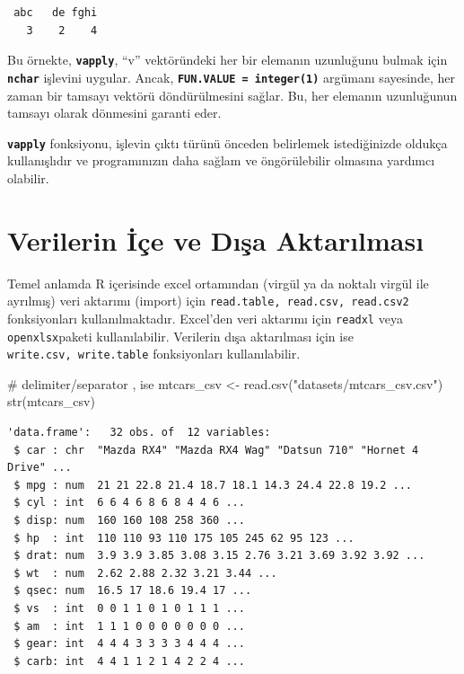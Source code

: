 \documentclass[
  letterpaper,
  DIV=11,
  numbers=noendperiod]{scrreprt}
\newenvironment{Shaded}{\begin{snugshade}}{\end{snugshade}}
\newcommand{\CommentTok}[1]{\textcolor[rgb]{0.37,0.37,0.37}{#1}}
\newcommand{\FunctionTok}[1]{\textcolor[rgb]{0.28,0.35,0.67}{#1}}
\newcommand{\NormalTok}[1]{\textcolor[rgb]{0.00,0.23,0.31}{#1}}
\newcommand{\OtherTok}[1]{\textcolor[rgb]{0.00,0.23,0.31}{#1}}
\newcommand{\StringTok}[1]{\textcolor[rgb]{0.13,0.47,0.30}{#1}}
\begin{document}
\begin{verbatim}
 abc   de fghi 
   3    2    4 
\end{verbatim}

Bu örnekte, \textbf{\texttt{vapply}}, ``v'' vektöründeki her bir
elemanın uzunluğunu bulmak için \textbf{\texttt{nchar}} işlevini
uygular. Ancak, \textbf{\texttt{FUN.VALUE\ =\ integer(1)}} argümanı
sayesinde, her zaman bir tamsayı vektörü döndürülmesini sağlar. Bu, her
elemanın uzunluğunun tamsayı olarak dönmesini garanti eder.

\textbf{\texttt{vapply}} fonksiyonu, işlevin çıktı türünü önceden
belirlemek istediğinizde oldukça kullanışlıdır ve programınızın daha
sağlam ve öngörülebilir olmasına yardımcı olabilir.

\chapter{Verilerin İçe ve Dışa
Aktarılması}\label{verilerin-iuxe7e-ve-dux131ux15fa-aktarux131lmasux131}

Temel anlamda R içerisinde excel ortamından (virgül ya da noktalı virgül
ile ayrılmış) veri aktarımı (import) için
\texttt{read.table,\ read.csv,\ read.csv2} fonksiyonları
kullanılmaktadır. Excel'den veri aktarımı için \texttt{readxl} veya
\texttt{openxlsx}paketi kullanılabilir. Verilerin dışa aktarılması için
ise \texttt{write.csv,\ write.table} fonksiyonları kullanılabilir.

\begin{Shaded}
\begin{Highlighting}[]
\CommentTok{\# delimiter/separator , ise}
\NormalTok{mtcars\_csv }\OtherTok{\textless{}{-}} \FunctionTok{read.csv}\NormalTok{(}\StringTok{"datasets/mtcars\_csv.csv"}\NormalTok{)}
\FunctionTok{str}\NormalTok{(mtcars\_csv)}
\end{Highlighting}
\end{Shaded}

\begin{verbatim}
'data.frame':   32 obs. of  12 variables:
 $ car : chr  "Mazda RX4" "Mazda RX4 Wag" "Datsun 710" "Hornet 4 Drive" ...
 $ mpg : num  21 21 22.8 21.4 18.7 18.1 14.3 24.4 22.8 19.2 ...
 $ cyl : int  6 6 4 6 8 6 8 4 4 6 ...
 $ disp: num  160 160 108 258 360 ...
 $ hp  : int  110 110 93 110 175 105 245 62 95 123 ...
 $ drat: num  3.9 3.9 3.85 3.08 3.15 2.76 3.21 3.69 3.92 3.92 ...
 $ wt  : num  2.62 2.88 2.32 3.21 3.44 ...
 $ qsec: num  16.5 17 18.6 19.4 17 ...
 $ vs  : int  0 0 1 1 0 1 0 1 1 1 ...
 $ am  : int  1 1 1 0 0 0 0 0 0 0 ...
 $ gear: int  4 4 4 3 3 3 3 4 4 4 ...
 $ carb: int  4 4 1 1 2 1 4 2 2 4 ...
\end{verbatim}
\end{document}
